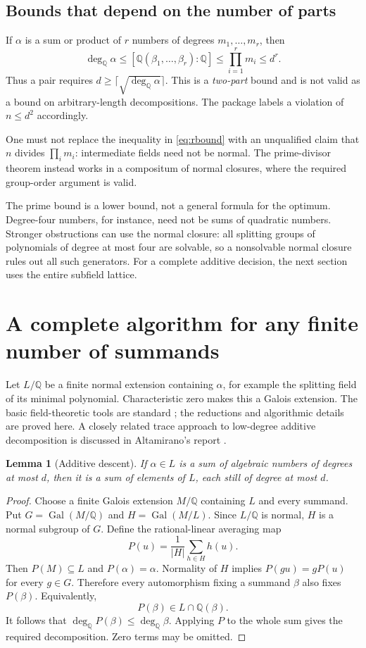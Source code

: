 \documentclass[11pt,a4paper]{article}
\newtheorem{lemma}[theorem]{Lemma}
\theoremstyle{definition}\newtheorem{definition}[theorem]{Definition}
\theoremstyle{remark}\newtheorem{remark}[theorem]{Remark}
\newcommand{\Q}{\mathbb{Q}}\newcommand{\C}{\mathbb{C}}
\newcommand{\Gal}{\operatorname{Gal}}
\newcommand{\degQ}{\deg_{\Q}}
\begin{document}
\subsection{Bounds that depend on the number of parts}
If $\alpha$ is a sum or product of $r$ numbers of degrees $m_1,\ldots,m_r$, then
\begin{equation}
\degQ\alpha\leq[\Q(\beta_1,\ldots,\beta_r):\Q]
                 \leq\prod_{i=1}^r m_i\leq d^r.\label{eq:rbound}
\end{equation}
Thus a pair requires $d\geq\lceil\sqrt{\degQ\alpha}\rceil$. This is a \emph{two-part} bound and is not valid as a bound on arbitrary-length decompositions. The package labels a violation of $n\leq d^2$ accordingly.

One must not replace the inequality in \eqref{eq:rbound} with an unqualified claim that $n$ divides $\prod_i m_i$: intermediate fields need not be normal. The prime-divisor theorem instead works in a compositum of normal closures, where the required group-order argument is valid.

The prime bound is a lower bound, not a general formula for the optimum. Degree-four numbers, for instance, need not be sums of quadratic numbers. Stronger obstructions can use the normal closure: all splitting groups of polynomials of degree at most four are solvable, so a nonsolvable normal closure rules out all such generators. For a complete additive decision, the next section uses the entire subfield lattice.

\section{A complete algorithm for any finite number of summands}
\label{sec:sumcomplete}
Let $L/\Q$ be a finite normal extension containing $\alpha$, for example the splitting field of its minimal polynomial. Characteristic zero makes this a Galois extension. The basic field-theoretic tools are standard \cite{milne}; the reductions and algorithmic details are proved here. A closely related trace approach to low-degree additive decomposition is discussed in Altamirano's report \cite{altamirano}.

\begin{lemma}[Additive descent]\label{lem:descent}
If $\alpha\in L$ is a sum of algebraic numbers of degrees at most $d$, then it is a sum of elements of $L$, each still of degree at most $d$.
\end{lemma}
\begin{proof}
Choose a finite Galois extension $M/\Q$ containing $L$ and every summand. Put $G=\Gal(M/\Q)$ and $H=\Gal(M/L)$. Since $L/\Q$ is normal, $H$ is a normal subgroup of $G$. Define the rational-linear averaging map
\[
P(u)=\frac{1}{|H|}\sum_{h\in H}h(u).
\]
Then $P(M)\subseteq L$ and $P(\alpha)=\alpha$. Normality of $H$ implies $P(g u)=gP(u)$ for every $g\in G$. Therefore every automorphism fixing a summand $\beta$ also fixes $P(\beta)$. Equivalently,
\[
P(\beta)\in L\cap\Q(\beta).
\]
It follows that $\degQ P(\beta)\leq\degQ\beta$. Applying $P$ to the whole sum gives the required decomposition. Zero terms may be omitted.\end{proof}
\end{document}

